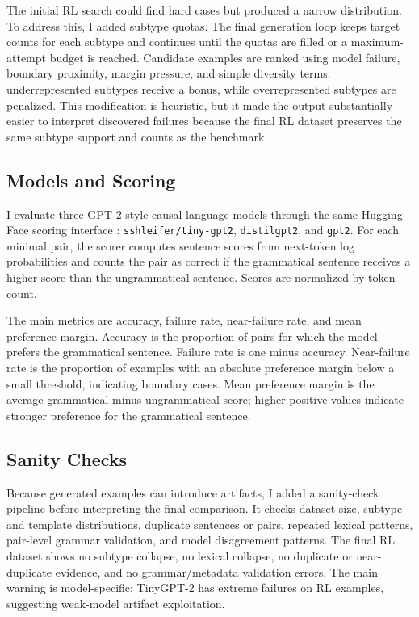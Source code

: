 \documentclass[11pt]{article}
\begin{document}
The initial RL search could find hard cases but produced a narrow
distribution. To address this, I added subtype quotas. The final generation
loop keeps target counts for each subtype and continues until the quotas are
filled or a maximum-attempt budget is reached. Candidate examples are ranked
using model failure, boundary proximity, margin pressure, and simple diversity
terms: underrepresented subtypes receive a bonus, while overrepresented
subtypes are penalized. This modification is heuristic, but it made the output
substantially easier to interpret discovered failures because the final RL
dataset preserves the same subtype support and counts as the benchmark.

\subsection{Models and Scoring}

I evaluate three GPT-2-style causal language models through the same Hugging
Face scoring interface \citep{radford2019language}:
\texttt{sshleifer/tiny-gpt2}, \texttt{distilgpt2}, and
\texttt{gpt2}. For each minimal pair, the scorer computes sentence scores from
next-token log probabilities and counts the pair as correct if the grammatical
sentence receives a higher score than the ungrammatical sentence. Scores are
normalized by token count.

The main metrics are accuracy, failure rate, near-failure rate, and mean
preference margin. Accuracy is the proportion of pairs for which the model
prefers the grammatical sentence. Failure rate is one minus accuracy.
Near-failure rate is the proportion of examples with an absolute preference
margin below a small threshold, indicating boundary cases. Mean preference
margin is the average grammatical-minus-ungrammatical score; higher positive
values indicate stronger preference for the grammatical sentence.

\subsection{Sanity Checks}

Because generated examples can introduce artifacts, I added a sanity-check
pipeline before interpreting the final comparison. It checks dataset size,
subtype and template distributions, duplicate sentences or pairs, repeated
lexical patterns, pair-level grammar validation, and model disagreement
patterns. The final RL dataset shows no subtype collapse, no lexical collapse,
no duplicate or near-duplicate evidence, and no grammar/metadata validation
errors. The main warning is model-specific: TinyGPT-2 has extreme failures on
RL examples, suggesting weak-model artifact exploitation.
\end{document}
